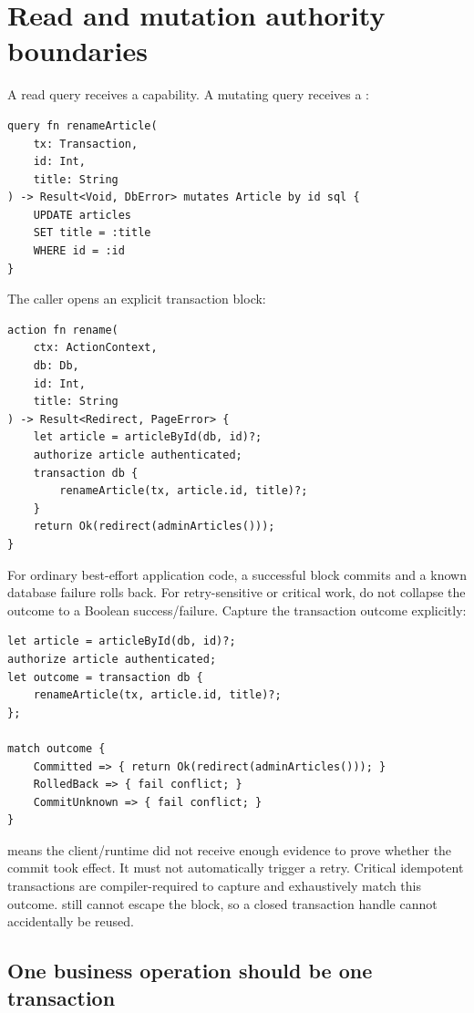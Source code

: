 \section{Read and mutation authority boundaries}

A read query receives a  capability. A mutating query receives a :

\begin{lstlisting}[language=RWLang]
query fn renameArticle(
    tx: Transaction,
    id: Int,
    title: String
) -> Result<Void, DbError> mutates Article by id sql {
    UPDATE articles
    SET title = :title
    WHERE id = :id
}
\end{lstlisting}

The caller opens an explicit transaction block:

\begin{lstlisting}[language=RWLang]
action fn rename(
    ctx: ActionContext,
    db: Db,
    id: Int,
    title: String
) -> Result<Redirect, PageError> {
    let article = articleById(db, id)?;
    authorize article authenticated;
    transaction db {
        renameArticle(tx, article.id, title)?;
    }
    return Ok(redirect(adminArticles()));
}
\end{lstlisting}

For ordinary best-effort application code, a successful block commits and a known database failure rolls back. For retry-sensitive or critical work, do not collapse the outcome to a Boolean success/failure. Capture the transaction outcome explicitly:

\begin{lstlisting}[language=RWLang]
let article = articleById(db, id)?;
authorize article authenticated;
let outcome = transaction db {
    renameArticle(tx, article.id, title)?;
};

match outcome {
    Committed => { return Ok(redirect(adminArticles())); }
    RolledBack => { fail conflict; }
    CommitUnknown => { fail conflict; }
}
\end{lstlisting}

 means the client/runtime did not receive enough evidence to prove whether the commit took effect. It must not automatically trigger a retry. Critical idempotent transactions are compiler-required to capture and exhaustively match this outcome.  still cannot escape the block, so a closed transaction handle cannot accidentally be reused.

\subsection*{One business operation should be one transaction}

